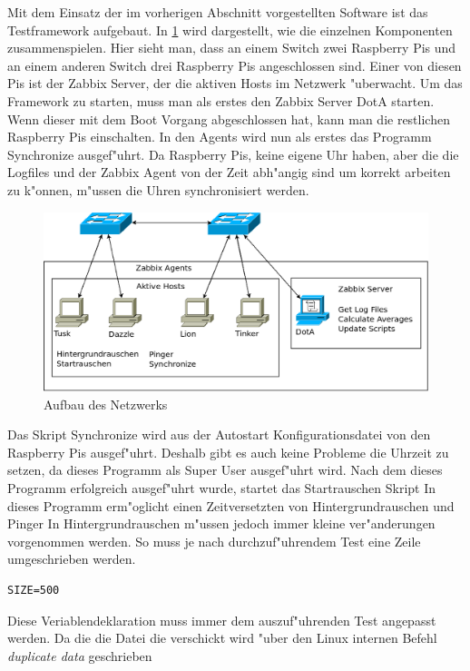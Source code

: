 Mit dem Einsatz der im vorherigen Abschnitt vorgestellten Software ist das Testframework aufgebaut. In \cref{fig:AufbauVomNetzwerk} %
wird dargestellt, wie die einzelnen Komponenten zusammenspielen. Hier sieht man, dass an einem Switch zwei Raspberry Pis %
und an einem anderen Switch drei Raspberry Pis angeschlossen sind. Einer von diesen Pis ist der Zabbix Server, der %
die aktiven Hosts im Netzwerk "uberwacht. Um das Framework zu starten, muss man als erstes den Zabbix Server DotA starten. %
Wenn dieser mit dem Boot Vorgang abgeschlossen hat, kann man die restlichen Raspberry Pis einschalten. %
In den Agents wird nun als erstes das Programm Synchronize ausgef"uhrt. Da Raspberry Pis, keine eigene Uhr haben, aber die %
die Logfiles und der Zabbix Agent von der Zeit abh"angig sind um korrekt arbeiten zu k"onnen, m"ussen die Uhren synchronisiert werden. %
\label{sec:einsatzImNetzwerk}
\begin{figure}[htbp]
\centering
\includegraphics*[width=0.9\linewidth]{Abb/Netzschaltung3}

\caption{Aufbau des Netzwerks}
\label{fig:AufbauVomNetzwerk}
\end{figure}
Das Skript Synchronize wird aus der Autostart Konfigurationsdatei von den Raspberry Pis ausgef"uhrt. Deshalb gibt es auch keine %
Probleme die Uhrzeit zu setzen, da dieses Programm als Super User ausgef"uhrt wird. %
Nach dem dieses Programm erfolgreich ausgef"uhrt wurde, startet das Startrauschen Skript %
In dieses Programm erm"oglicht einen Zeitversetzten von Hintergrundrauschen und Pinger %
In Hintergrundrauschen m"ussen jedoch immer kleine ver"anderungen vorgenommen werden. %
So muss je nach durchzuf"uhrendem Test eine Zeile umgeschrieben werden. %
\begin{verbatim}
SIZE=500
\end{verbatim}
Diese Veriablendeklaration muss immer dem auszuf"uhrenden Test angepasst werden. %
Da die die Datei die verschickt wird "uber den Linux internen Befehl \emph{duplicate data} geschrieben %
